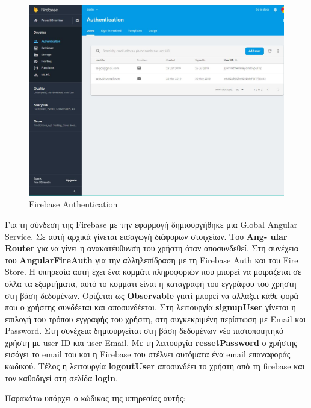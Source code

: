 \documentclass[a4paper,12pt]{article}
\begin{document}
			\begin{figure}[!htb]
				\begin{center}
					\caption{Firebase Authentication}
					\vspace*{0.5cm}

					\includegraphics[width=0.9\linewidth]{firebaseNo1} 
				\end{center}
			\end{figure}

			\newpage
			Για τη σύνδεση της Firebase με την εφαρμογή δημιουργήθηκε μια Global\newline
			Angular Service. Σε αυτή αρχικά γίνεται εισαγωγή διάφορων στοιχείων.  
			Του \textbf{Ang-
			ular Router} για να γίνει η ανακατέυθυνση
			του χρήστη όταν αποσυνδεθεί. Στη συνέχεια του \textbf{AngularFireAuth} για την αλληλεπίδραση με τη Firebase Auth και του Fire Store. Η υπηρεσία αυτή έχει ένα κομμάτι
			πληροφοριών που μπορεί να μοιράζεται σε όλλα τα εξαρτήματα, αυτό το κομμάτι είναι η καταγραφή του εγγράφου του χρήστη στη βάση δεδομένων. Ορίζεται ως  \textbf{Observable} γιατί
			μπορεί να αλλάξει κάθε φορά που ο χρήστης συνδέεται και αποσυνδέεται. Στη λειτουργία \textbf{signupUser} γίνεται η επιλογή του τρόπου εγγραφής του χρήστη, στη συγκεκριμένη 
			περίπτωση με Email και Password. Στη συνέχεια δημιουργείται στη βάση δεδομένων νέο πιστοποιητηκό χρήστη με user ID και user Email. Με τη λειτουργία 
			\textbf{ressetPassword} ο χρήστης εισάγει το email του και η Firebase του στέλνει αυτόματα ένα email επαναφοράς κωδικού. Τέλος η λειτουργία \textbf{logoutUser} αποσυνδέει το χρήστη από
			τη firebase και τον καθοδιγεί στη σελίδα \textbf{login}.

			Παρακάτω υπάρχει ο κώδικας της υπηρεσίας αυτής:
\end{document}
